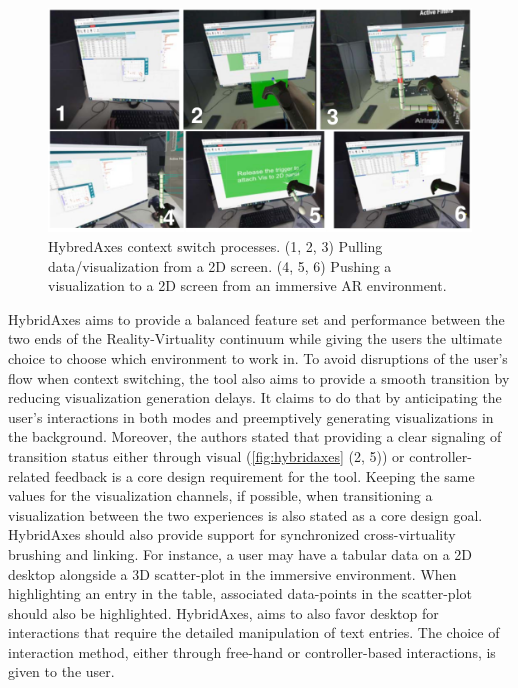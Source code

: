 \documentclass{vgtc}                          %
\begin{document}
\begin{figure}[tb]
	\centering
	\includegraphics[width=\columnwidth]{hybridaxes}
	\caption[Caption for RagRug]{HybredAxes context switch processes. (1, 2, 3)
		Pulling data/visualization from a 2D screen. (4, 5, 6) Pushing a
		visualization to a 2D screen from an immersive AR environment.}
	\label{fig:hybridaxes}
\end{figure}

\noindent HybridAxes aims to provide a balanced feature set and performance
between the two ends of the Reality-Virtuality continuum while giving the users
the ultimate choice to choose which environment to work in. To avoid
disruptions of the user's flow when context switching, the tool also aims to
provide a smooth transition by reducing visualization generation delays. It
claims to do that by anticipating the user's interactions in both modes and
preemptively generating
visualizations in the background. Moreover, the authors stated that providing
a clear signaling of transition status either through visual (\autoref{fig:hybridaxes} (2, 5)) or
controller-related feedback is a core design requirement for the tool.
Keeping the same values for the visualization channels, if possible, when
transitioning a visualization between the two experiences is also stated as
a core design goal. HybridAxes should also provide support for synchronized
cross-virtuality brushing and linking. For instance, a user may have a tabular
data on a 2D desktop alongside a 3D scatter-plot in the immersive environment.
When highlighting an entry in the table, associated data-points in the
scatter-plot should also be highlighted. HybridAxes, aims to also favor desktop
for interactions that require the detailed manipulation of text entries. The
choice of interaction method, either through free-hand or
controller-based interactions, is given to the user.
\end{document}
